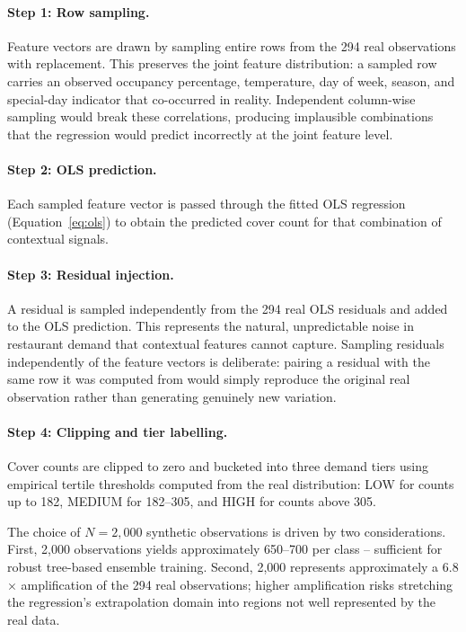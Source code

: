 \documentclass[12pt,a4paper,oneside]{article}
\begin{document}
\paragraph{Step 1: Row sampling.} Feature vectors are drawn by sampling entire rows from the 294 real observations with replacement. This preserves the joint feature distribution: a sampled row carries an observed occupancy percentage, temperature, day of week, season, and special-day indicator that co-occurred in reality. Independent column-wise sampling would break these correlations, producing implausible combinations that the regression would predict incorrectly at the joint feature level.

\paragraph{Step 2: OLS prediction.} Each sampled feature vector is passed through the fitted OLS regression (Equation~\ref{eq:ols}) to obtain the predicted cover count for that combination of contextual signals.

\paragraph{Step 3: Residual injection.} A residual is sampled independently from the 294 real OLS residuals and added to the OLS prediction. This represents the natural, unpredictable noise in restaurant demand that contextual features cannot capture. Sampling residuals independently of the feature vectors is deliberate: pairing a residual with the same row it was computed from would simply reproduce the original real observation rather than generating genuinely new variation.

\paragraph{Step 4: Clipping and tier labelling.} Cover counts are clipped to zero and bucketed into three demand tiers using empirical tertile thresholds computed from the real distribution: LOW for counts up to 182, MEDIUM for 182--305, and HIGH for counts above 305.

The choice of $N = 2{,}000$ synthetic observations is driven by two considerations. First, 2,000 observations yields approximately 650--700 per class -- sufficient for robust tree-based ensemble training. Second, 2,000 represents approximately a 6.8$\times$ amplification of the 294 real observations; higher amplification risks stretching the regression's extrapolation domain into regions not well represented by the real data.
\end{document}
